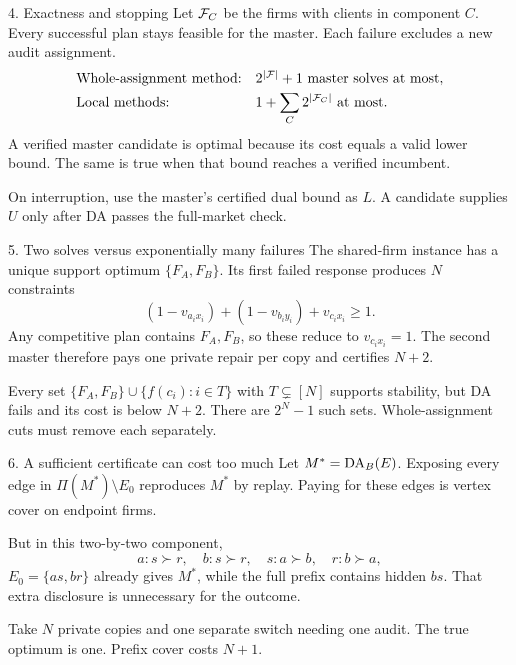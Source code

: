 \begin{frame}[t,label=exactness]{4. Exactness and stopping}
\small
Let $\mathcal F_C$ be the firms with clients in component $C$. Every successful plan
stays feasible for the master. Each failure excludes a new audit assignment.
\[
 \begin{array}{ll}
 \text{Whole-assignment method:}&2^{|\mathcal F|}+1\text{ master solves at most},\\[3pt]
 \text{Local methods:}&1+\displaystyle\sum_C2^{|\mathcal F_C|}\text{ at most}.
 \end{array}
\]
A verified master candidate is optimal because its cost equals a valid
lower bound. The same is true when that bound reaches a verified incumbent.

\medskip
On interruption, use the master's certified dual bound as $L$.
A candidate supplies $U$ only after DA passes the full-market check.
\end{frame}

\begin{frame}[t,label=round-proof]{5. Two solves versus exponentially many failures}
\small
The shared-firm instance has a unique support optimum $\{F_A,F_B\}$.
Its first failed response produces $N$ constraints
\[
 (1-v_{a_ix_i})+(1-v_{b_iy_i})+v_{c_ix_i}\geq1.
\]
Any competitive plan contains $F_A,F_B$, so these reduce to $v_{c_ix_i}=1$.
The second master therefore pays one private repair per copy and certifies $N+2$.

\medskip
Every set $\{F_A,F_B\}\cup\{f(c_i):i\in T\}$ with $T\subsetneq[N]$ supports stability,
but DA fails and its cost is below $N+2$. There are $2^N-1$ such sets.
Whole-assignment cuts must remove each separately.
\end{frame}

\begin{frame}[t,label=prefix-cover]{6. A sufficient certificate can cost too much}
\small
Let $M^*=\operatorname{DA}_{B}(E)$. Exposing every edge in $\Pi(M^*)\setminus E_0$
reproduces $M^*$ by replay. Paying for these edges is vertex cover on endpoint firms.

\medskip
But in this two-by-two component,
\[
 a:s\succ r,\quad b:s\succ r,\quad
 s:a\succ b,\quad r:b\succ a,
\]
$E_0=\{as,br\}$ already gives $M^*$, while the full prefix contains hidden $bs$.
That extra disclosure is unnecessary for the outcome.

\medskip
Take $N$ private copies and one separate switch needing one audit.
The true optimum is one. Prefix cover costs $N+1$.
\end{frame}

